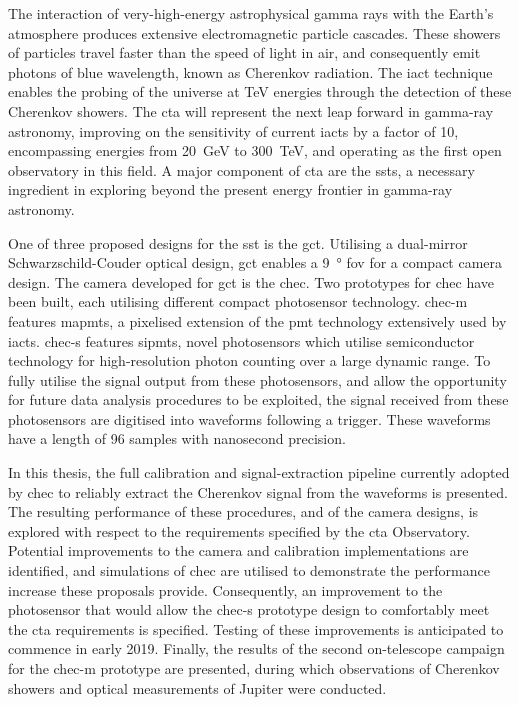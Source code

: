 The interaction of very-high-energy astrophysical gamma rays with the Earth's atmosphere produces extensive electromagnetic particle cascades. These showers of particles travel faster than the speed of light in air, and consequently emit photons of blue wavelength, known as Cherenkov radiation. The \gls{iact} technique enables the probing of the universe at \si{TeV} energies through the detection of these Cherenkov showers. The \gls{cta} will represent the next leap forward in gamma-ray astronomy, improving on the sensitivity of current \glspl{iact} by a factor of 10, encompassing energies from \SI{20}{GeV} to \SI{300}{TeV}, and operating as the first open observatory in this field. A major component of \gls{cta} are the \glspl{sst}, a necessary ingredient in exploring beyond the present energy frontier in gamma-ray astronomy.

One of three proposed designs for the \gls{sst} is the \gls{gct}. Utilising a dual-mirror Schwarzschild-Couder optical design, \gls{gct} enables a \SI{9}{\degree} \gls{fov} for a compact camera design. The camera developed for \gls{gct} is the \gls{chec}. Two prototypes for \gls{chec} have been built, each utilising different compact photosensor technology. \gls{chec-m} features \glspl{mapmt}, a pixelised extension of the \gls{pmt} technology extensively used by \glspl{iact}. \mbox{\gls{chec-s}} features \glspl{sipmt}, novel photosensors which utilise semiconductor technology for high-resolution photon counting over a large dynamic range. To fully utilise the signal output from these photosensors, and allow the opportunity for future data analysis procedures to be exploited, the signal received from these photosensors are digitised into waveforms following a trigger. These waveforms have a length of 96 samples with nanosecond precision.

In this thesis, the full calibration and signal-extraction pipeline currently adopted by \gls{chec} to reliably extract the Cherenkov signal from the waveforms is presented. The resulting performance of these procedures, and of the camera designs, is explored with respect to the requirements specified by the \gls{cta} Observatory. Potential improvements to the camera and calibration implementations are identified, and simulations of \gls{chec} are utilised to demonstrate the performance increase these proposals provide. Consequently, an improvement to the photosensor that would allow the \gls{chec-s} prototype design to comfortably meet the \gls{cta} requirements is specified. Testing of these improvements is anticipated to commence in early 2019. Finally, the results of the second on-telescope campaign for the \gls{chec-m} prototype are presented, during which observations of Cherenkov showers and optical measurements of Jupiter were conducted.